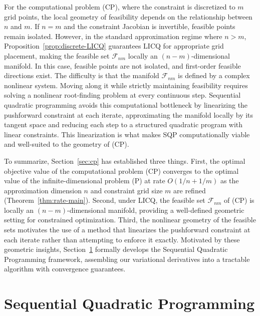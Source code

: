 \documentclass[12pt,leqno]{amsart}
\begin{document}
For the computational problem (CP), where the constraint is discretized to $m$ grid points, the local geometry of feasibility depends on the relationship between $n$ and $m$. If $n = m$ and the constraint Jacobian is invertible, feasible points remain isolated. However, in the standard approximation regime where $n > m$, Proposition~\ref{prop:discrete-LICQ} guarantees LICQ for appropriate grid placement, making the feasible set $\mathcal{F}_{nm}$ locally an $(n - m)$-dimensional manifold. In this case, feasible points are not isolated, and first-order feasible directions exist. The difficulty is that the manifold $\mathcal{F}_{nm}$ is defined by a complex nonlinear system. Moving along it while strictly maintaining feasibility requires solving a nonlinear root-finding problem at every continuous step. Sequential quadratic programming avoids this computational bottleneck by linearizing the pushforward constraint at each iterate, approximating the manifold locally by its tangent space and reducing each step to a structured quadratic program with linear constraints. This linearization is what makes SQP computationally viable and well-suited to the geometry of (CP).

To summarize, Section~\ref{sec:cp} has established three things. First, the optimal objective value of the computational problem (CP) converges to the optimal value of the infinite-dimensional problem (P) at rate $O(1/n + 1/m)$ as the approximation dimension $n$ and constraint grid size $m$ are refined (Theorem~\ref{thm:rate-main}). Second, under LICQ, the feasible set $\mathcal{F}_{nm}$ of (CP) is locally an $(n-m)$-dimensional manifold, providing a well-defined geometric setting for constrained optimization. Third, the nonlinear geometry of the feasible sets motivates the use of a method that linearizes the pushforward constraint at each iterate rather than attempting to enforce it exactly. Motivated by these geometric insights, Section~\ref{sec:SQP} formally develops the Sequential Quadratic Programming framework, assembling our variational derivatives into a tractable algorithm with convergence guarantees.

\section{Sequential Quadratic Programming}\label{sec:SQP}
\end{document}
